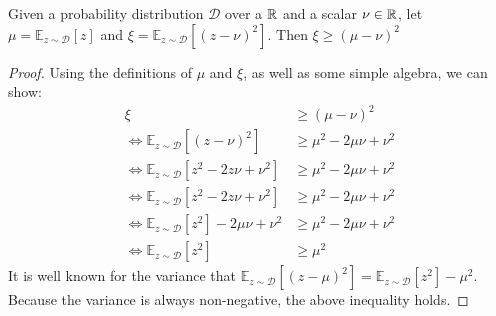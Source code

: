 \begin{lemma}\label{lemma_2}
Given a probability distribution $\mathcal{D}$ over a ${\mathbb{R}}$ and a scalar $\nu \in {\mathbb{R}}$,
let $\mu = \mathbb{E}_{z\sim \mathcal{D}}\left[z\right]$ and
$\xi = \mathbb{E}_{z\sim \mathcal{D}}\left[\left(z - \nu\right)^2\right]$.
Then $\xi \geq \left(\mu - \nu\right)^2$
\end{lemma}
\begin{proof}
Using the definitions of $\mu$ and $\xi$, as well as some simple algebra, we can show:
\begin{align}
\xi & \geq \left(\mu - \nu\right)^2
\\
\iff
\mathbb{E}_{z\sim \mathcal{D}}\left[\left(z - \nu\right)^2\right]
 &\geq \mu^2 - 2 \mu \nu + \nu^2\\
\iff
\mathbb{E}_{z\sim \mathcal{D}}\left[z^2 - 2 z \nu + \nu^2\right]
 &\geq \mu^2 - 2 \mu \nu + \nu^2\\
\iff
\mathbb{E}_{z\sim \mathcal{D}}\left[z^2 - 2 z \nu + \nu^2\right]
 &\geq \mu^2 - 2 \mu \nu + \nu^2\\
\iff
\mathbb{E}_{z\sim \mathcal{D}}\left[z^2\right] - 2 \mu \nu + \nu^2
 &\geq \mu^2 - 2 \mu \nu + \nu^2 \\
\iff
\mathbb{E}_{z\sim \mathcal{D}}\left[z^2\right]
 &\geq \mu^2
\end{align}
It is well known for the variance that $\mathbb{E}_{z\sim \mathcal{D}}\left[(z - \mu)^2\right] = \mathbb{E}_{z\sim \mathcal{D}}\left[z^2\right] - \mu^2$. Because the variance is always non-negative, the above inequality holds.
\end{proof}

